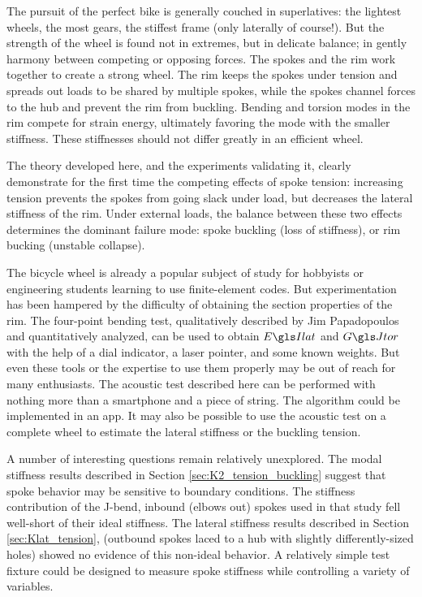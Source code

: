 \documentclass[\rootdir/thesis.tex]{subfiles}
\begin{document}

The pursuit of the perfect bike is generally couched in superlatives: the lightest wheels, the most gears, the stiffest frame (only laterally of course!). But the strength of the wheel is found not in extremes, but in delicate balance; in gently harmony between competing or opposing forces. The spokes and the rim work together to create a strong wheel. The rim keeps the spokes under tension and spreads out loads to be shared by multiple spokes, while the spokes channel forces to the hub and prevent the rim from buckling. Bending and torsion modes in the rim compete for strain energy, ultimately favoring the mode with the smaller stiffness. These stiffnesses should not differ greatly in an efficient wheel.

The theory developed here, and the experiments validating it, clearly demonstrate for the first time the competing effects of spoke tension: increasing tension prevents the spokes from going slack under load, but decreases the lateral stiffness of the rim. Under external loads, the balance between these two effects determines the dominant failure mode: spoke buckling (loss of stiffness), or rim bucking (unstable collapse).

The bicycle wheel is already a popular subject of study for hobbyists or engineering students learning to use finite-element codes. But experimentation has been hampered by the difficulty of obtaining the section properties of the rim. The four-point bending test, qualitatively described by Jim Papadopoulos and quantitatively analyzed, can be used to obtain $\EIl$ and $\GJ$ with the help of a dial indicator, a laser pointer, and some known weights. But even these tools or the expertise to use them properly may be out of reach for many enthusiasts. The acoustic test described here can be performed with nothing more than a smartphone and a piece of string. The algorithm could be implemented in an app. It may also be possible to use the acoustic test on a complete wheel to estimate the lateral stiffness or the buckling tension.

A number of interesting questions remain relatively unexplored. The modal stiffness results described in Section \ref{sec:K2_tension_buckling} suggest that spoke behavior may be sensitive to boundary conditions. The stiffness contribution of the J-bend, inbound (elbows out) spokes used in that study fell well-short of their ideal stiffness. The lateral stiffness results described in Section \ref{sec:Klat_tension}, (outbound spokes laced to a hub with slightly differently-sized holes) showed no evidence of this non-ideal behavior. A relatively simple test fixture could be designed to measure spoke stiffness while controlling a variety of variables.
\end{document}
